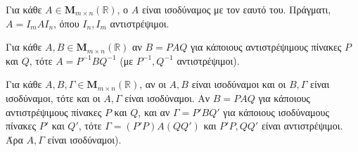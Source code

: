 \begin{rem}
\item {}
  \begin{myitemize}
    \item Για κάθε $ A \in \textbf{M}_{m \times n}(\mathbb{R}) $, ο $A$ είναι ισοδύναμος 
      με τον εαυτό του. Πράγματι, $ A = I_{m}AI_{n} $, όπου $ I_{n}, I_{m} $ 
      αντιστρέψιμοι.
    \item Για κάθε $ A,B \in \textbf{M}_{m \times n}(\mathbb{R}) $ αν $ B=PAQ $ για 
      κάποιους αντιστρέψιμους πίνακες $ P $ και $Q$, τότε $ A=P^{-1}BQ^{-1} $ 
      (με $ P^{-1}, Q^{-1} $ αντιστρέψιμοι).
    \item Για κάθε $ A,B, \Gamma \in \textbf{M}_{m \times n}(\mathbb{R}) $, αν οι 
      $ A,B $ είναι ισοδύναμοι και οι $ B, \Gamma $ είναι ισοδύναμοι, τότε και οι 
      $ A, \Gamma $ είναι ισοδύναμοι. Αν $ B=PAQ $ για κάποιους αντιστρέψιμους πίνακες 
      $ P $ και $ Q $, και αν $ \Gamma = P'BQ' $ για κάποιους ισοδύναμους πίνακες 
      $ P' $ και $ Q' $, τότε $ \Gamma = (P'P)A(QQ') $ και $ P'P, QQ'$ είναι
      αντιστρέψιμοι. Άρα $ A,\Gamma $ είναι ισοδύναμοι).
  \end{myitemize}
\end{rem}

